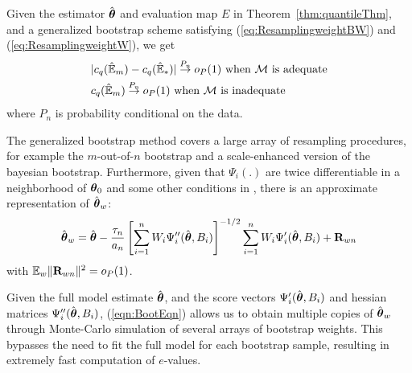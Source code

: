 \begin{Theorem}\label{thm:bootThm}
Given the estimator $\hat {{\boldsymbol{\theta}}}$ and evaluation map $E$ in Theorem~\ref{thm:quantileThm}, and a generalized bootstrap scheme satisfying (\ref{eq:ResamplingweightBW}) and (\ref{eq:ResamplingweightW}), we get
\begin{align}
& | c_{q} ( \hat {{\mathbb{E}}}_{m } ) - c_{q} ( \hat {{\mathbb{E}}}_{* } ) | \stackrel{P_n}{\rightarrow} o_P(1) \text{ when } {\cal{M}} \text{ is adequate}\label{bootevalEqn2}\\
& c_{q} ( \hat {{\mathbb{E}}}_{m } ) \stackrel{P_n}{\rightarrow} o_P(1) \text{ when } {\cal{M}} \text{ is inadequate} \label{bootevalEqn3}
\end{align}
%
where $P_n$ is probability conditional on the data.
\end{Theorem}

The generalized bootstrap method covers a large array of resampling procedures, for example the $m$-out-of-$n$ bootstrap and a scale-enhanced version of the bayesian bootstrap. %
 Furthermore, given that $\Psi_i(.)$ are twice differentiable in a neighborhood of ${\boldsymbol{\theta}}_0$ and some other conditions in \cite{ChatterjeeBose05}, there is an approximate representation of $\hat {{\boldsymbol{\theta}}}_w$:
%
\begin{align}\label{eqn:BootEqn}
\hat{{\boldsymbol{\theta}}}_w = \hat{{\boldsymbol{\theta}}} - \frac{ \tau_n}{a_n} \left[ \sum_{i=1}^n W_i \Psi_i'' (\hat {{\boldsymbol{\theta}}}, B_i) \right]^{-1/2}
\sum_{i=1}^n W_i \Psi_i' (\hat {{\boldsymbol{\theta}}}, B_i) + {\mathbf{R}}_{wn}
\end{align}
%
with ${\mathbb{E}}_w \| {\mathbf{R}}_{w n} \|^2 = o_P(1)$.

Given the full model estimate $\hat {{\boldsymbol{\theta}}}$, and the score vectors $ \Psi_i' (\hat {{\boldsymbol{\theta}}}, B_i)$ and hessian matrices $ \Psi_i'' (\hat {{\boldsymbol{\theta}}}, B_i)$, (\ref{eqn:BootEqn}) allows us to obtain multiple copies of $\hat {{\boldsymbol{\theta}}}_w$ through Monte-Carlo simulation of several arrays of bootstrap weights. This bypasses the need to fit the full model for each bootstrap sample, resulting in extremely fast computation of $e$-values.

